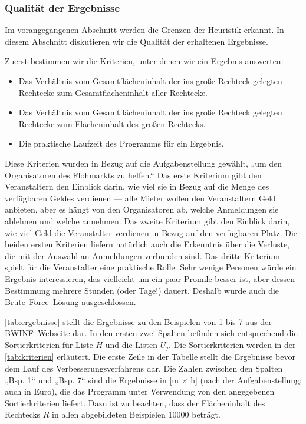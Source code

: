 \subsubsection{Qualität der Ergebnisse}\label{sec:diskussion-ergebnisse}
Im vorangegangenen Abschnitt werden die Grenzen der Heuristik erkannt. 
In diesem Abschnitt diskutieren wir die Qualität der erhaltenen Ergebnisse.

Zuerst bestimmen wir die Kriterien, unter denen wir ein Ergebnis auswerten:
\begin{itemize}
	\item Das Verhältnis vom Gesamtflächeninhalt der ins große Rechteck gelegten Rechtecke 
	zum Gesamtflächeninhalt aller Rechtecke.
	\item Das Verhältnis vom Gesamtflächeninhalt der ins große Rechteck gelegten Rechtecke 
	zum Flächeninhalt des großen Rechtecks.
	\item Die praktische Laufzeit des Programms für ein Ergebnis.
\end{itemize}

Diese Kriterien wurden in Bezug auf die Aufgabenstellung gewählt,
„um den Organisatoren des Flohmarkts zu helfen.“
Das erste Kriterium gibt den Veranstaltern den Einblick darin,
wie viel sie in Bezug auf die Menge des verfügbaren Geldes verdienen ---
alle Mieter wollen den Veranstaltern Geld anbieten, aber es hängt von den 
Organisatoren ab, welche Anmeldungen sie ablehnen und welche annehmen.
Das zweite Kriterium gibt den Einblick darin, wie viel Geld die 
Veranstalter verdienen in Bezug auf den verfügbaren Platz. 
Die beiden ersten Kriterien liefern natürlich auch die Erkenntnis über die Verluste, die 
mit der Auswahl an Anmeldungen verbunden sind.
Das dritte Kriterium spielt für die Veranstalter eine praktische Rolle.
Sehr wenige Personen würde ein Ergebnis interessieren, das vielleicht um ein paar Promile 
besser ist, aber dessen Bestimmung mehrere Stunden (oder Tage!) dauert. 
Deshalb wurde auch die Brute--Force--Lösung ausgeschlossen.

\cref{tab:ergebnisse} stellt die Ergebnisse zu den Beispielen von \hyperref[ex:1]{1} bis \hyperref[ex:7]{7}
aus der BWINF--Webseite dar.
In den ersten zwei Spalten befinden sich entsprechend die Sortierkriterien für Liste
$H$ und die Listen $U_j$. Die Sortierkriterien werden in der \cref{tab:kriterien} erläutert.
Die erste Zeile in der Tabelle stellt die Ergebnisse bevor dem Lauf des Verbesserungsverfahrens dar.
Die Zahlen zwischen den Spalten „Bsp. 1“ und „Bsp. 7“ sind die Ergebnisse in [m $\times$ h]
(nach der Aufgabenstellung: auch in Euro),
die das Programm unter Verwendung von den angegebenen Sortierkriterien liefert.
Dazu ist zu beachten, dass der Flächeninhalt des Rechtecks $R$ in allen abgebildeten Beispielen
10000 beträgt.
 
